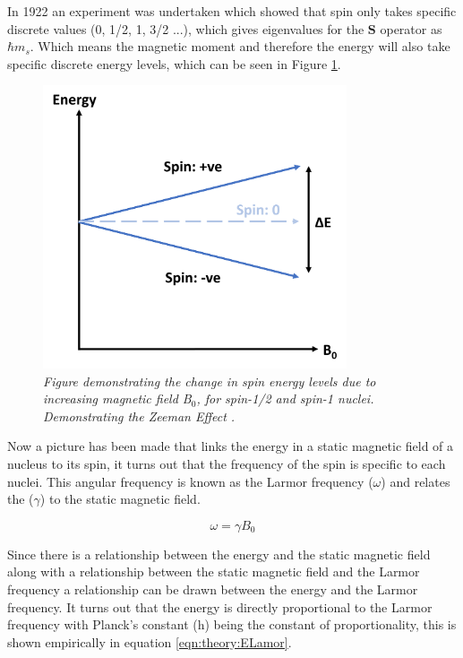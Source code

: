 \documentclass[class=article, crop=false]{standalone}
\begin{document}
In 1922 an experiment was undertaken \cite{Gerlach1922DerMagnetfeld} which showed that spin only takes specific discrete values (0, 1/2, 1, 3/2 ...), which gives eigenvalues for the $\mathbf{S}$ operator as $\hbar m_s$. Which means the magnetic moment and therefore the energy will also take specific discrete energy levels, which can be seen in Figure \ref{fig:theory:zeeman}.

\begin{figure}[h]
    \centering
    \includegraphics[width=0.8\textwidth]{Figures/Theory/Zeeman.png}
    \caption{\textit{Figure demonstrating the change in spin energy levels due to increasing magnetic field B$_0$, for spin-1/2 and spin-1 nuclei. Demonstrating the Zeeman Effect \cite{Zeeman1896VerslagenAfdeeling}.}}
    \label{fig:theory:zeeman}
\end{figure}

Now a picture has been made that links the energy in a static magnetic field of a nucleus to its spin, it turns out that the frequency of the spin is specific to each nuclei. This angular frequency is known as the Larmor frequency \cite{Larmor1897LXIII.Ions} ($\omega$) and relates the ($\gamma$) to the static magnetic field.

\begin{equation}
    \omega = \gamma B_0
    \label{eqn:theory:Lamor}
\end{equation}

Since there is a relationship between the energy and the static magnetic field along with a relationship between the static magnetic field and the Larmor frequency a relationship can be drawn between the energy and the Larmor frequency. It turns out that the energy is directly proportional to the Larmor frequency with Planck's constant (h) being the constant of proportionality, this is shown empirically in equation \ref{eqn:theory:ELamor}.
\end{document}
